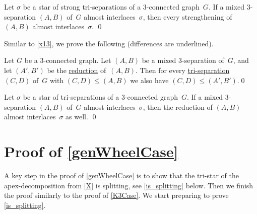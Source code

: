\documentclass{aic}
\theoremstyle{plain}
\theoremstyle{definition}
\theoremstyle{plain}
\theoremstyle{plain}
\renewcommand{\leq}{\leqslant}
\begin{document}
\begin{cor}\label{capture_star2}
Let $\sigma$ be a star of strong tri-separations of a 3-connected graph~$G$.
If a mixed 3-separation $(A,B)$ of~$G$ almost interlaces~$\sigma$, then every strengthening of $(A,B)$ almost interlaces~$\sigma$.
\qed
\end{cor}


Similar to \autoref{x13}, we prove the following (differences are underlined).


\begin{lem}\label{x12}
Let $G$ be a 3-connected graph.
Let $(A,B)$ be a mixed 3-separation of~$G$, and let $(A',B')$ be the \underline{reduction} of~$(A,B)$.
Then for every \underline{tri-separation}~$(C,D)$ of~$G$ with $(C,D)\leq (A,B)$ we also have $(C,D)\leq (A',B')$.\qed
\end{lem}


\begin{cor}\label{capture_star}
Let $\sigma$ be a star of tri-separations of a 3-connected graph~$G$.
If a mixed 3-separation $(A,B)$ of~$G$ almost interlaces~$\sigma$, then the reduction of $(A,B)$ almost interlaces~$\sigma$ as well.
\qed
\end{cor}

\section[Proof of (ii)]{Proof of \ref{genWheelCase}}

A key step in the proof of  \ref{genWheelCase} is to show that the tri-star of the apex-decomposition from \autoref{X} is splitting, see \autoref{is_splitting} below.
Then we finish the proof similarly to the proof of \ref{K3Case}. We start preparing to prove \autoref{is_splitting}. 
\end{document}
